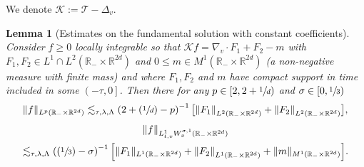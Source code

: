 \documentclass[11pt]{article}
\numberwithin{equation}{section}\let\oldbigcup\bigcup
\let\mathcal\mathscr
\newcommand{\Psfrac}[2]{(\sfrac{#1}{#2})}
\newtheorem{lemma}[theorem]{Lemma}
\theoremstyle{definition}
\theoremstyle{remark}
\newcommand\R{{\mathbb R}}
\newcommand{\cK}{\mathcal K}
\newcommand{\cT}{\mathcal T}
\begin{document}
We denote $\cK := \cT - \Delta_v$.
\begin{lemma}[Estimates on the fundamental solution with constant
coefficients]
\label{lem:Kolmogorov}
Consider $f \ge 0$ locally integrable so that
$\cK f = \nabla_v \cdot F_1 + F_2 - m$ with
$F_1,F_2 \in L^1 \cap L^2(\R_- \times \R^{2d})$ and
$0 \le m \in M^1(\R_- \times \R^{2d})$ (a non-negative measure
with finite mass) and where $F_1, F_2$ and $m$ have compact
support in time included in some $\left(-\tau,0\right]$. Then
there for any $p \in [2,2+\sfrac1d)$ and
$\sigma \in [0,\sfrac13)$
\begin{equation}
\label{eq:Kolm1}
\| f\|_{L^{p}(\R_- \times \R^{2d})}\lesssim_{\tau,\lambda,\Lambda}
\left(2+\Psfrac1d-p\right)^{-1}
\bigl[ \left\| F_1 \right\|_{L^2(\R_- \times \R^{2d})} +
\left\| F_2 \right\|_{L^2(\R_- \times \R^{2d})} \bigr],
\end{equation}
\begin{multline}\label{eq:Kolm2}
\| f\|_{L^1_{t,v} W^{\sigma,1}_x(\R_- \times \R^{2d})} \\
\lesssim_{\tau,\lambda,\Lambda}
\left(\Psfrac13-\sigma \right)^{-1} \Bigl[ \|
F_1 \|_{L^1(\R_- \times \R^{2d})} + \left\| F_2
\right\|_{L^1(\R_- \times \R^{2d})} + \| m \|_{M^1(\R_- \times
\R^{2d})} \Bigr].
\end{multline}
\end{lemma}
\end{document}
